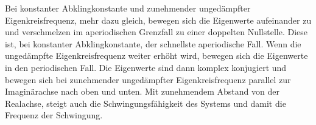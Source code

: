 \begin{frame}[t]
{Bei konstanter Abklingkonstante und zunehmender ungedämpfter Eigenkreisfrequenz, mehr dazu gleich, bewegen sich die Eigenwerte aufeinander zu und verschmelzen im aperiodischen Grenzfall zu einer doppelten Nullstelle.
Diese ist, bei konstanter Abklingkonstante, der schnellste aperiodische Fall.
Wenn die ungedämpfte Eigenkreisfrequenz weiter erhöht wird, bewegen sich die Eigenwerte in den periodischen Fall.
Die Eigenwerte sind dann komplex konjugiert und bewegen sich bei zunehmender ungedämpfter Eigenkreisfrequenz parallel zur Imaginärachse nach oben und unten.
Mit zunehmendem Abstand von der Realachse, steigt auch die Schwingungsfähigkeit des Systems und damit die Frequenz der Schwingung. 
}%
\end{frame}


\newpage%
